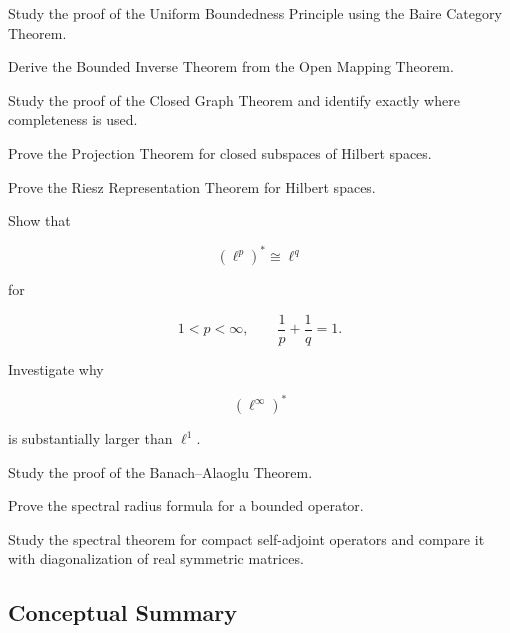 \begin{exercise}[4]
Study the proof of the Uniform Boundedness Principle using the Baire
Category Theorem.
\end{exercise}

\begin{exercise}[4]
Derive the Bounded Inverse Theorem from the Open Mapping Theorem.
\end{exercise}

\begin{exercise}[4]
Study the proof of the Closed Graph Theorem and identify exactly where
completeness is used.
\end{exercise}

\begin{exercise}[4]
Prove the Projection Theorem for closed subspaces of Hilbert spaces.
\end{exercise}

\begin{exercise}[4]
Prove the Riesz Representation Theorem for Hilbert spaces.
\end{exercise}

\begin{exercise}[4]
Show that

\[
(\ell^p)^*\cong\ell^q
\]

for

\[
1<p<\infty,
\qquad
\frac1p+\frac1q=1.
\]
\end{exercise}

\begin{exercise}[4]
Investigate why

\[
(\ell^\infty)^*
\]

is substantially larger than \(\ell^1\).
\end{exercise}

\begin{exercise}[4]
Study the proof of the Banach--Alaoglu Theorem.
\end{exercise}

\begin{exercise}[4]
Prove the spectral radius formula for a bounded operator.
\end{exercise}

\begin{exercise}[4]
Study the spectral theorem for compact self-adjoint operators and compare
it with diagonalization of real symmetric matrices.
\end{exercise}

\subsection{Conceptual Summary}
\label{subsec:functional-analysis-summary}

